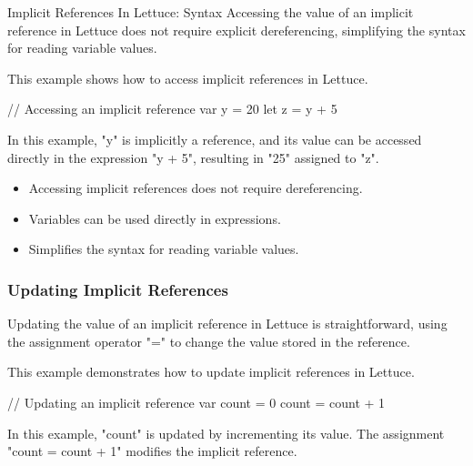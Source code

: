 \begin{notes}{Implicit References In Lettuce: Syntax}
    Accessing the value of an implicit reference in Lettuce does not require explicit dereferencing, simplifying the syntax for reading variable values.
    
    \begin{highlight}
    
        This example shows how to access implicit references in Lettuce.
    
    \begin{code}[Lettuce]
    // Accessing an implicit reference
    var y = 20
    let z = y + 5
    \end{code}
    
        In this example, "y" is implicitly a reference, and its value can be accessed directly in the expression "y + 5", resulting in "25" assigned to "z".
    
        \begin{itemize}
            \item Accessing implicit references does not require dereferencing.
            \item Variables can be used directly in expressions.
            \item Simplifies the syntax for reading variable values.
        \end{itemize}
    
    \end{highlight}
    
    \subsubsection*{Updating Implicit References}
    
    Updating the value of an implicit reference in Lettuce is straightforward, using the assignment operator "=" to change the value stored in the reference.
    
    \begin{highlight}
    
        This example demonstrates how to update implicit references in Lettuce.
    
    \begin{code}[Lettuce]
    // Updating an implicit reference
    var count = 0
    count = count + 1
    \end{code}
    
        In this example, "count" is updated by incrementing its value. The assignment "count = count + 1" modifies the implicit reference.
    

\end{highlight}
\end{notes}
